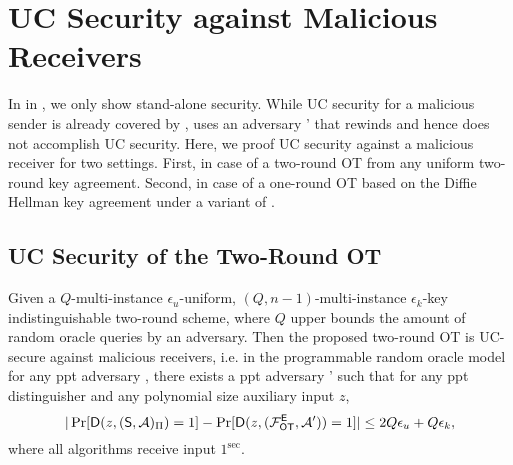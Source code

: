 \section{UC Security against Malicious Receivers}\label{sec:UCOT}

In  in , we only show stand-alone security. While UC security for a malicious sender is already covered by , 
 uses an adversary \Adv' that rewinds \Adv and hence does not accomplish UC security. Here, we proof UC security against a malicious receiver for two settings. First, in case of a two-round OT from any uniform two-round key agreement. Second, in case of a one-round OT based on the Diffie Hellman key agreement under a variant of \DDH.  


\subsection{UC Security of the Two-Round OT}
 
\begin{claim}\label{claim:UCmalreceiver}
Given a  $Q$-multi-instance $\epsilon_u$-uniform,  $(Q,n-1)$-multi-instance $\epsilon_k$-key indistinguishable two-round \UKA scheme, where $Q$ upper bounds the amount of random oracle queries by an adversary. Then the proposed two-round OT is UC-secure against malicious receivers, i.e. in the programmable random oracle model for any ppt adversary \Adv, there exists a ppt adversary \Adv' such that for any ppt distinguisher \D and any polynomial size auxiliary input $z$,
$$
|\Pr[\mathsf D(z,(\mathsf{S}, \mathcal{A})_{\Pi})=1] -\Pr[\mathsf D(z,(\mathcal{F}_{\mathsf{OT}}^\mathsf{E},\mathcal{A}'))=1]|\leq 2Q\epsilon_{u}+Q\epsilon_{k},
$$
where all algorithms receive input $1^\sec$.
\end{claim}


